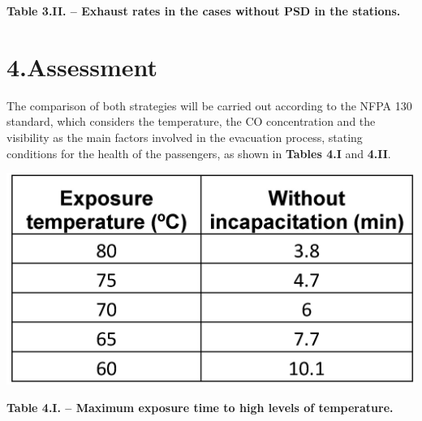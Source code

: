 \documentclass{article}
\begin{document}
\begin{mdcenter}%

\noindent{}\textbf{Table 3.II. – Exhaust rates in the cases without PSD in the stations.}%
\end{mdcenter}%

\section{4.\hspace*{0.5em}Assessment}\label{sec-assessment}%

\noindent{}The comparison of both strategies will be carried out according to the NFPA 130 
standard, which considers the temperature, the CO concentration and the visibility 
as the main factors involved in the evacuation process, stating conditions for the 
health of the passengers, as shown in \textbf{Tables 4.I} and \textbf{4.II}.%

\begin{mdcenter}%

\noindent{}\includegraphics[keepaspectratio=true,width=\dimmin{}{\dimwidth{0.40}}]{images/Table-4.I}{}%
\end{mdcenter}%

\begin{mdcenter}%

\noindent{}\textbf{Table 4.I. – Maximum exposure time to high levels of temperature.}%
\end{mdcenter}%
\end{document}
